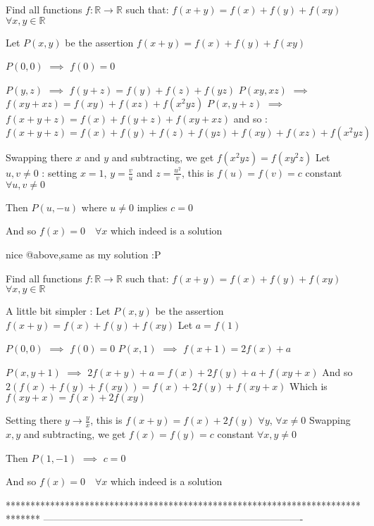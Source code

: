 \begin{solution}
	\begin{tcolorbox}Find all functions $f : \mathbb R \to \mathbb R $ such that:
$f(x+y)=f(x)+f(y)+f(xy) $ $\forall x,y \in \mathbb R $\end{tcolorbox}
Let $P(x,y)$ be the assertion $f(x+y)=f(x)+f(y)+f(xy)$

$P(0,0)$ $\implies$ $f(0)=0$

$P(y,z)$ $\implies$ $f(y+z)=f(y)+f(z)+f(yz)$
$P(xy,xz)$ $\implies$ $f(xy+xz)=f(xy)+f(xz)+f(x^2yz)$
$P(x,y+z)$ $\implies$ $f(x+y+z)=f(x)+f(y+z)+f(xy+xz)$ and so :
$f(x+y+z)=f(x)+f(y)+f(z)+f(yz)+f(xy)+f(xz)+f(x^2yz)$

Swapping there $x$ and $y$ and subtracting, we get $f(x^2yz)=f(xy^2z)$ 
Let $u,v\ne 0$ : setting $x=1$, $y=\frac vu$ and $z=\frac{u^2}v$, this is 
$f(u)=f(v)=c$ constant $\forall u,v\ne 0$

Then $P(u,-u)$ where $u\ne 0$ implies $c=0$

And so $\boxed{f(x)=0\quad\forall x}$ which indeed is a solution


\end{solution}



\begin{solution}
	nice @above,same as my solution :P
\end{solution}



\begin{solution}
	\begin{tcolorbox}Find all functions $f : \mathbb R \to \mathbb R $ such that:
$f(x+y)=f(x)+f(y)+f(xy) $ $\forall x,y \in \mathbb R $\end{tcolorbox}
A little bit simpler :
Let $P(x,y)$ be the assertion $f(x+y)=f(x)+f(y)+f(xy)$
Let $a=f(1)$

$P(0,0)$ $\implies$ $f(0)=0$
$P(x,1)$ $\implies$ $f(x+1)=2f(x)+a$

$P(x,y+1)$ $\implies$ $2f(x+y)+a=f(x)+2f(y)+a+f(xy+x)$
And so $2(f(x)+f(y)+f(xy))=f(x)+2f(y)+f(xy+x)$
Which is $f(xy+x)=f(x)+2f(xy)$

Setting there $y\to \frac yx$, this is $f(x+y)=f(x)+2f(y)$ $\forall y$, $\forall x\ne 0$
Swapping $x,y$ and subtracting, we get $f(x)=f(y)=c$ constant $\forall x,y\ne 0$

Then $P(1,-1)$ $\implies$ $c=0$

And so $\boxed{f(x)=0\quad\forall x}$ which indeed is a solution


\end{solution}
*******************************************************************************
-------------------------------------------------------------------------------

